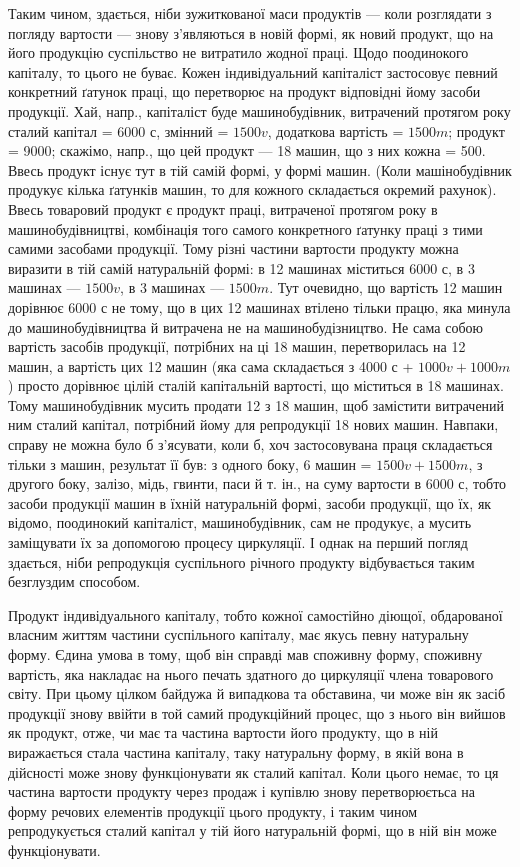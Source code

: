 \parcont{}  %
Таким чином, здається, ніби  зужиткованої маси продуктів — коли
розглядати з погляду вартости — знову з’являються в новій формі, як
новий продукт, що на його продукцію суспільство не витратило
жодної праці. Щодо поодинокого капіталу, то цього не буває. Кожен індивідуальний
капіталіст застосовує певний конкретний ґатунок праці, що перетворює
на продукт відповідні йому засоби продукції. Хай, напр., капіталіст
буде машинобудівник, витрачений протягом року сталий капітал = 6000 с,
змінний = $1500 v$, додаткова вартість = $1500 m$; продукт = 9000; скажімо,
напр., що цей продукт — 18 машин, що з них кожна = 500. Ввесь продукт
існує тут в тій самій формі, у формі машин. (Коли машінобудівник продукує
кілька ґатунків машин, то для кожного складається окремий рахунок).
Ввесь товаровий продукт є продукт праці, витраченої протягом
року в машинобудівництві, комбінація того самого конкретного ґатунку
праці з тими самими засобами продукції. Тому різні частини вартости
продукту можна виразити в тій самій натуральній формі: в 12 машинах
міститься 6000 с, в 3 машинах — $1500 v$, в 3 машинах — $1500 m$. Тут
очевидно, що вартість 12 машин дорівнює 6000 с не тому, що в цих
12 машинах втілено тільки працю, яка минула до машинобудівництва й
витрачена не на машинобудізництво. Не сама собою вартість засобів
продукції, потрібних на ці 18 машин, перетворилась на 12 машин, а вартість
цих 12 машин (яка сама складається з 4000 с + $1000 v + 1000 m$)
просто дорівнює цілій сталій капітальній вартості, що міститься в 18 машинах.
Тому машинобудівник мусить продати 12 з 18 машин, щоб замістити
витрачений ним сталий капітал, потрібний йому для репродукції 18
нових машин. Навпаки, справу не можна було б з’ясувати, коли б, хоч
застосовувана праця складається тільки з машин, результат її був: з
одного боку, 6 машин = $1500 v + 1500 m$, з другого боку, залізо,
мідь, гвинти, паси й т. ін., на суму вартости в 6000 с, тобто засоби продукції
машин в їхній натуральній формі, засоби продукції, що їх, як відомо,
поодинокий капіталіст, машинобудівник, сам не продукує, а мусить
заміщувати їх за допомогою процесу циркуляції. І однак на перший погляд
здається, ніби репродукція суспільного річного продукту відбувається
таким безглуздим способом.

Продукт індивідуального капіталу, тобто кожної самостійно діющої,
обдарованої власним життям частини суспільного капіталу, має якусь певну
натуральну форму. Єдина умова в тому, щоб він справді мав споживну
форму, споживну вартість, яка накладає на нього печать здатного до
циркуляції члена товарового світу. При цьому цілком байдужа й випадкова
та обставина, чи може він як засіб продукції знову ввійти в той
самий продукційний процес, що з нього він вийшов як продукт, отже, чи
має та частина вартости його продукту, що в ній виражається стала частина
капіталу, таку натуральну форму, в якій вона в дійсності може знову
функціонувати як сталий капітал. Коли цього немає, то ця частина вартости
продукту через продаж і купівлю знову перетворюєтьса на форму речових
елементів продукції цього продукту, і таким чином репродукується сталий
капітал у тій його натуральній формі, що в ній він може функціонувати.
